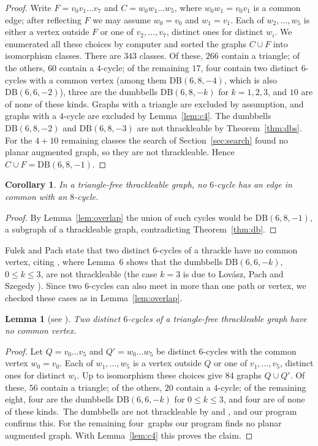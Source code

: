 \documentclass[11pt]{amsart}
\newtheorem{lemma}[theorem]{Lemma}
\newtheorem{corollary}[theorem]{Corollary}
\theoremstyle{definition}
\theoremstyle{remark}
\numberwithin{equation}{section}
\newcommand{\DB}{\mathrm{DB}}
\newcommand{\NCLASSES}{343}
\begin{document}
\begin{proof}
Write $F=v_0v_1\dots v_7$ and $C=w_0w_1\dots w_5$, where $w_0w_1=v_0v_1$ is a common edge; after reflecting $F$ we may assume $w_0=v_0$ and $w_1=v_1$. Each of $w_2,\dots,w_5$ is either a vertex outside $F$ or one of $v_2,\dots,v_7$, distinct ones for distinct $w_i$. We enumerated all these choices by computer and sorted the graphs $C\cup F$ into isomorphism classes. There are $\NCLASSES$ classes. Of these, $266$ contain a triangle; of the others, $60$ contain a $4$-cycle; of the remaining $17$, four contain two distinct $6$-cycles with a common vertex (among them $\DB(6,8,-4)$, which is also $\DB(6,6,-2)$), three are the dumbbells $\DB(6,8,-k)$ for $k=1,2,3$, and $10$ are of none of these kinds. Graphs with a triangle are excluded by assumption, and graphs with a $4$-cycle are excluded by Lemma~\ref{lem:c4}. The dumbbells $\DB(6,8,-2)$ and $\DB(6,8,-3)$ are not thrackleable by Theorem~\ref{thm:dbs}. For the $4+10$ remaining classes the search of Section~\ref{sec:search} found no planar augmented graph, so they are not thrackleable. Hence $C\cup F=\DB(6,8,-1)$.
\end{proof}

\begin{corollary}\label{cor:noshare}
In a triangle-free thrackleable graph, no $6$-cycle has an edge in common with an $8$-cycle.
\end{corollary}

\begin{proof}
By Lemma~\ref{lem:overlap} the union of such cycles would be $\DB(6,8,-1)$, a subgraph of a thrackleable graph, contradicting Theorem~\ref{thm:db}.
\end{proof}

Fulek and Pach \cite[Section~3]{FP19} state that two distinct $6$-cycles of a thrackle have no common vertex, citing \cite{FP11}, where Lemma~6 shows that the dumbbells $\DB(6,6,-k)$, $0\le k\le3$, are not thrackleable (the case $k=3$ is due to Lov\'asz, Pach and Szegedy \cite[Theorem~5.1]{LPS97}). Since two $6$-cycles can also meet in more than one path or vertex, we checked these cases as in Lemma~\ref{lem:overlap}.

\begin{lemma}[see {\cite[Section~3]{FP19}}]\label{lem:six}
Two distinct $6$-cycles of a triangle-free thrackleable graph have no common vertex.
\end{lemma}

\begin{proof}
Let $Q=v_0\dots v_5$ and $Q'=w_0\dots w_5$ be distinct $6$-cycles with the common vertex $w_0=v_0$. Each of $w_1,\dots,w_5$ is a vertex outside $Q$ or one of $v_1,\dots,v_5$, distinct ones for distinct $w_i$. Up to isomorphism these choices give $84$ graphs $Q\cup Q'$. Of these, $56$ contain a triangle; of the others, $20$ contain a $4$-cycle; of the remaining eight, four are the dumbbells $\DB(6,6,-k)$ for $0\le k\le3$, and four are of none of these kinds.\ The dumbbells are not thrackleable by \cite[Lemma~6]{FP11} and \cite[Theorem~5.1]{LPS97}, and our program confirms this. For the remaining four\ graphs our program finds no planar augmented graph. With Lemma~\ref{lem:c4} this proves the claim.
\end{proof}
\end{document}
